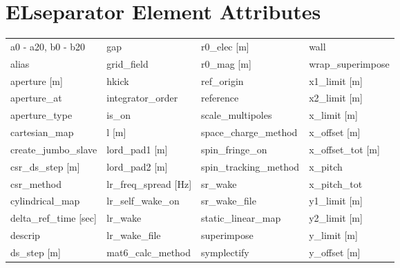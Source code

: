  \section{ELseparator Element Attributes}
 \label{s:list.elseparator}
 
 \begin{tabular}{llll} \toprule
a0 - a20, b0 - b20               & gap                              & r0_elec [m]                      & wall                             \\
alias                            & grid_field                       & r0_mag [m]                       & wrap_superimpose                 \\
aperture [m]                     & hkick                            & ref_origin                       & x1_limit [m]                     \\
aperture_at                      & integrator_order                 & reference                        & x2_limit [m]                     \\
aperture_type                    & is_on                            & scale_multipoles                 & x_limit [m]                      \\
cartesian_map                    & l [m]                            & space_charge_method              & x_offset [m]                     \\
create_jumbo_slave               & lord_pad1 [m]                    & spin_fringe_on                   & x_offset_tot [m]                 \\
csr_ds_step [m]                  & lord_pad2 [m]                    & spin_tracking_method             & x_pitch                          \\
csr_method                       & lr_freq_spread [Hz]              & sr_wake                          & x_pitch_tot                      \\
cylindrical_map                  & lr_self_wake_on                  & sr_wake_file                     & y1_limit [m]                     \\
delta_ref_time [sec]             & lr_wake                          & static_linear_map                & y2_limit [m]                     \\
descrip                          & lr_wake_file                     & superimpose                      & y_limit [m]                      \\
ds_step [m]                      & mat6_calc_method                 & symplectify                      & y_offset [m]                     \\

\end{tabular}
